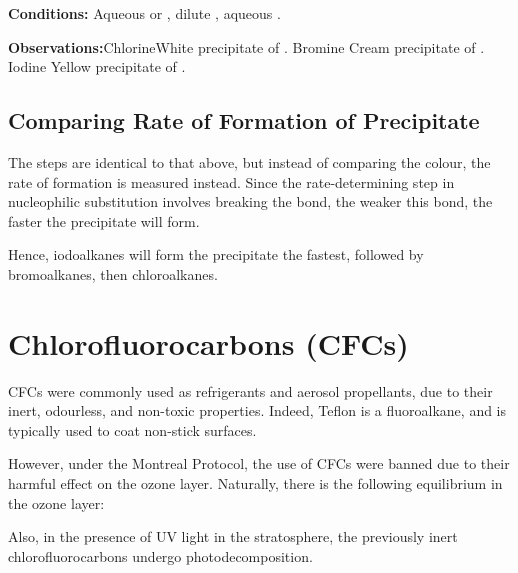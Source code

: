 			\vspace{1.5em}
			\vbox{\textbf{Conditions:}	\tabto{35mm}Aqueous  or , dilute , aqueous .}

			\vspace{0.75em}
			\vbox{\textbf{Observations:}\tabto{35mm}Chlorine\tabto{60mm}White precipitate of .
										\tabto{35mm}Bromine	\tabto{60mm}Cream precipitate of .
										\tabto{35mm}Iodine	\tabto{60mm}Yellow precipitate of .}

		\subsection{Comparing Rate of Formation of Precipitate}

			The steps are identical to that above, but instead of comparing the colour, the rate of formation is measured instead. Since the
			rate-determining step in nucleophilic substitution involves breaking the  bond, the weaker this bond, the faster the
			precipitate will form.

			Hence, iodoalkanes will form the precipitate the fastest, followed by bromoalkanes, then chloroalkanes.



	\pagebreak
	\section{Chlorofluorocarbons (CFCs)}

		CFCs were commonly used as refrigerants and aerosol propellants, due to their inert, odourless, and non-toxic properties.
		Indeed, Teflon is a fluoroalkane, and is typically used to coat non-stick surfaces.

		However, under the Montreal Protocol, the use of CFCs were banned due to their harmful effect on the ozone layer. Naturally, there
		is the following equilibrium in the ozone layer:



		Also, in the presence of UV light in the stratosphere, the previously inert chlorofluorocarbons undergo photodecomposition.


